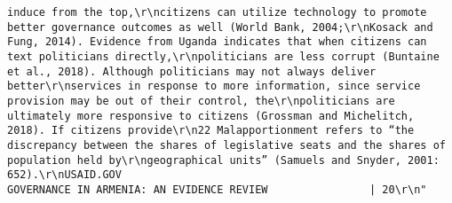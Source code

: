 \documentclass[
]{article}
\begin{document}
\begin{verbatim}
induce from the top,\r\ncitizens can utilize technology to promote better governance outcomes as well (World Bank, 2004;\r\nKosack and Fung, 2014). Evidence from Uganda indicates that when citizens can text politicians directly,\r\npoliticians are less corrupt (Buntaine et al., 2018). Although politicians may not always deliver better\r\nservices in response to more information, since service provision may be out of their control, the\r\npoliticians are ultimately more responsive to citizens (Grossman and Michelitch, 2018). If citizens provide\r\n22 Malapportionment refers to “the discrepancy between the shares of legislative seats and the shares of population held by\r\ngeographical units” (Samuels and Snyder, 2001: 652).\r\nUSAID.GOV                                                        GOVERNANCE IN ARMENIA: AN EVIDENCE REVIEW                | 20\r\n"                                                                                                                                                                                                                                                                                                                                                                                                                                                                                                                                                                                                                                                                                                                                                                                                                                                                                     

\end{verbatim}
\end{document}
